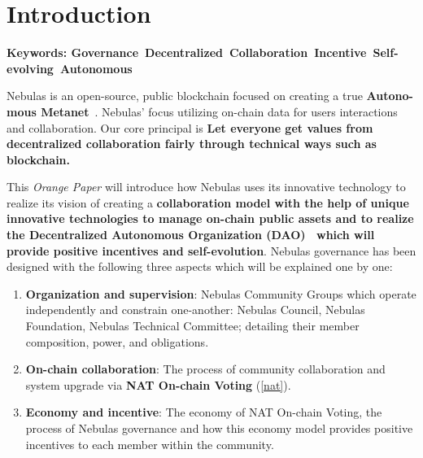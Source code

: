 
\section{Introduction}

\textbf{Keywords: Governance\ Decentralized\ Collaboration\ Incentive\ Self-evolving\ Autonomous }

\vspace{2em}

Nebulas is an open-source, public blockchain focused on creating a true
\textbf{Autono-mous Metanet}~\cite{AutonomousMetanet}. Nebulas' focus utilizing on-chain data for users interactions and collaboration. Our core principal is \textbf{Let everyone get values from decentralized collaboration fairly through technical ways such as blockchain.}~\cite{vision}

This \textit{Orange Paper} will introduce how Nebulas uses its innovative technology to realize its vision of creating a \textbf{collaboration model with the help of unique innovative technologies to manage on-chain public assets and to realize the Decentralized Autonomous Organization (DAO)~\cite{DAO} which will provide positive incentives and self-evolution}. Nebulas governance has been designed with the following three aspects which will be explained one by one:

\begin{enumerate}
	\item \textbf{Organization and supervision}:
	Nebulas Community Groups which operate independently and constrain one-another: Nebulas Council, Nebulas Foundation, Nebulas Technical Committee; detailing their member composition, power, and obligations.
	\item \textbf{On-chain collaboration}:
	The process of community collaboration and system upgrade via \textbf{NAT On-chain Voting} (\ref{nat}).
	\item \textbf{Economy and incentive}:
	The economy of NAT On-chain Voting, the process of Nebulas governance and how this economy model provides positive incentives to each member within the community.
\end{enumerate}
